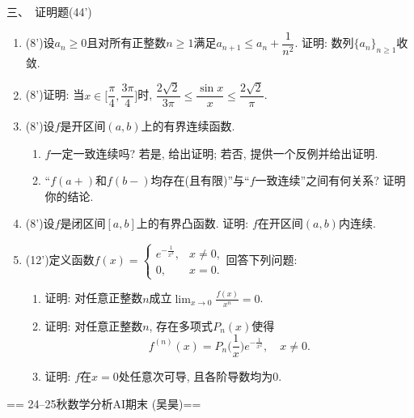 三、\ 证明题(44')
\begin{enumerate}
    \item (8')设$a_n\geq0$且对所有正整数$n\geq1$满足$a_{n+1}\leq a_n+\dfrac{1}{n^2}$. 证明: 数列$\{a_n\}_{n\geq1}$收敛.
    \item (8')证明: 当$x\in\Big[\dfrac{\pi}{4},\dfrac{3\pi}{4}\Big]$时, $\dfrac{2\sqrt{2}}{3\pi}\leq\dfrac{\sin x}{x}\leq\dfrac{2\sqrt2}{\pi}$.
    \item (8')设$f$是开区间$(a,b)$上的有界连续函数.
    \begin{enumerate}[label=(\alph*)]
        \item $f$一定一致连续吗? 若是, 给出证明; 若否, 提供一个反例并给出证明.
        \item “$f(a+)$和$f(b-)$均存在(且有限)”与“$f$一致连续”之间有何关系? 证明你的结论.
    \end{enumerate}
    \item (8')设$f$是闭区间$[a,b]$上的有界凸函数. 证明: $f$在开区间$(a,b)$内连续.
    \item (12')定义函数$f(x)=\begin{cases}e^{-\frac{1}{x^2}},&x\neq0,\\0,&x=0.\end{cases}$回答下列问题:
    \begin{enumerate}[label=(\alph*)]
        \item 证明: 对任意正整数$n$成立$\displaystyle\lim_{x\to0}\frac{f(x)}{x^n}=0$.
        \item 证明: 对任意正整数$n$, 存在多项式$P_n(x)$使得
        $$f^{(n)}(x)=P_n\Big(\frac{1}{x}\Big)e^{-\frac{1}{x^2}}, \quad x\neq0.$$
        \item 证明: $f$在$x=0$处任意次可导, 且各阶导数均为$0$.
    \end{enumerate}
\end{enumerate}

== 24--25秋数学分析AI期末 (吴昊)==

